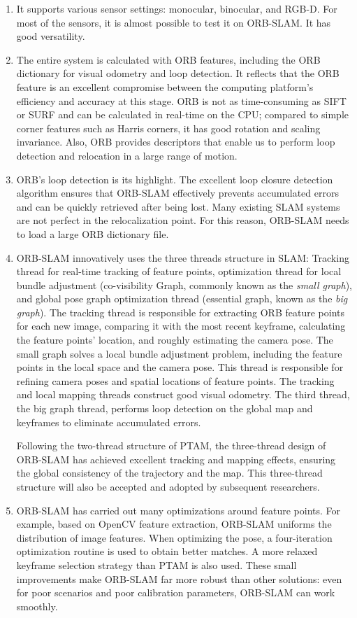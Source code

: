 \begin{enumerate}
	\item It supports various sensor settings: monocular, binocular, and RGB-D. For most of the sensors, it is almost possible to test it on ORB-SLAM. It has good versatility.
	\item The entire system is calculated with ORB features, including the ORB dictionary for visual odometry and loop detection. It reflects that the ORB feature is an excellent compromise between the computing platform's efficiency and accuracy at this stage. ORB is not as time-consuming as SIFT or SURF and can be calculated in real-time on the CPU; compared to simple corner features such as Harris corners, it has good rotation and scaling invariance. Also, ORB provides descriptors that enable us to perform loop detection and relocation in a large range of motion.
	\item ORB's loop detection is its highlight. The excellent loop closure detection algorithm ensures that ORB-SLAM effectively prevents accumulated errors and can be quickly retrieved after being lost. Many existing SLAM systems are not perfect in the relocalization point. For this reason, ORB-SLAM needs to load a large ORB dictionary file.
	\item ORB-SLAM innovatively uses the three threads structure in SLAM: Tracking thread for real-time tracking of feature points, optimization thread for local bundle adjustment (co-visibility Graph, commonly known as the \textit{small graph}), and global pose graph optimization thread (essential graph, known as the \textit{big graph}). The tracking thread is responsible for extracting ORB feature points for each new image, comparing it with the most recent keyframe, calculating the feature points' location, and roughly estimating the camera pose. The small graph solves a local bundle adjustment problem, including the feature points in the local space and the camera pose. This thread is responsible for refining camera poses and spatial locations of feature points. The tracking and local mapping threads construct good visual odometry. The third thread, the big graph thread, performs loop detection on the global map and keyframes to eliminate accumulated errors. 
	
	Following the two-thread structure of PTAM, the three-thread design of ORB-SLAM has achieved excellent tracking and mapping effects, ensuring the global consistency of the trajectory and the map. This three-thread structure will also be accepted and adopted by subsequent researchers.
	\item ORB-SLAM has carried out many optimizations around feature points. For example, based on OpenCV feature extraction, ORB-SLAM uniforms the distribution of image features. When optimizing the pose, a four-iteration optimization routine is used to obtain better matches. A more relaxed keyframe selection strategy than PTAM is also used. These small improvements make ORB-SLAM far more robust than other solutions: even for poor scenarios and poor calibration parameters, ORB-SLAM can work smoothly.
\end{enumerate}

